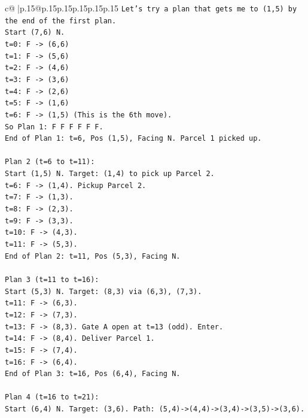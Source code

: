 \documentclass{article}
\begin{document}
{\begin{supertabular}{c@{$\;$}|p{.15\linewidth}@{}p{.15\linewidth}p{.15\linewidth}p{.15\linewidth}p{.15\linewidth}p{.15\linewidth}}
{{{\texttt{Let's try a plan that gets me to (1,5) by the end of the first plan.} \\
\texttt{Start (7,6) N.} \\
\texttt{t=0: F {-}> (6,6)} \\
\texttt{t=1: F {-}> (5,6)} \\
\texttt{t=2: F {-}> (4,6)} \\
\texttt{t=3: F {-}> (3,6)} \\
\texttt{t=4: F {-}> (2,6)} \\
\texttt{t=5: F {-}> (1,6)} \\
\texttt{t=6: F {-}> (1,5) (This is the 6th move).} \\
\texttt{So Plan 1: F F F F F F.} \\
\texttt{End of Plan 1: t=6, Pos (1,5), Facing N. Parcel 1 picked up.} \\
\\ 
\texttt{Plan 2 (t=6 to t=11):} \\
\texttt{Start (1,5) N. Target: (1,4) to pick up Parcel 2.} \\
\texttt{t=6: F {-}> (1,4). Pickup Parcel 2.} \\
\texttt{t=7: F {-}> (1,3).} \\
\texttt{t=8: F {-}> (2,3).} \\
\texttt{t=9: F {-}> (3,3).} \\
\texttt{t=10: F {-}> (4,3).} \\
\texttt{t=11: F {-}> (5,3).} \\
\texttt{End of Plan 2: t=11, Pos (5,3), Facing N.} \\
\\ 
\texttt{Plan 3 (t=11 to t=16):} \\
\texttt{Start (5,3) N. Target: (8,3) via (6,3), (7,3).} \\
\texttt{t=11: F {-}> (6,3).} \\
\texttt{t=12: F {-}> (7,3).} \\
\texttt{t=13: F {-}> (8,3). Gate A open at t=13 (odd). Enter.} \\
\texttt{t=14: F {-}> (8,4). Deliver Parcel 1.} \\
\texttt{t=15: F {-}> (7,4).} \\
\texttt{t=16: F {-}> (6,4).} \\
\texttt{End of Plan 3: t=16, Pos (6,4), Facing N.} \\
\\ 
\texttt{Plan 4 (t=16 to t=21):} \\
\texttt{Start (6,4) N. Target: (3,6). Path: (5,4){-}>(4,4){-}>(3,4){-}>(3,5){-}>(3,6).} \\
}}}
\end{supertabular}}
\end{document}
